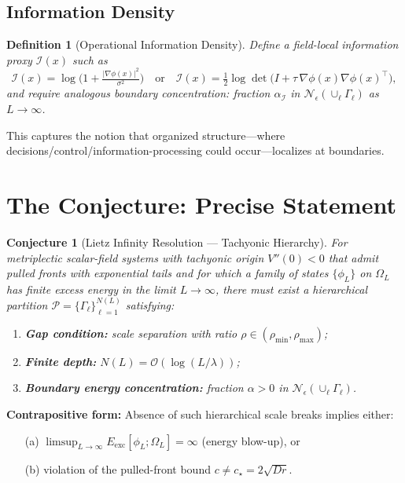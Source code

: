 \documentclass{article}
\newtheorem{conjecture}{Conjecture}
\newtheorem{definition}{Definition}
\begin{document}
\subsection{Information Density}

\begin{definition}[Operational Information Density]
Define a field-local information proxy $\mathcal{I}(x)$ such as
\begin{equation}
\mathcal{I}(x) = \log\!\big(1 + \tfrac{|\nabla \phi(x)|^2}{\sigma^2}\big)
\quad\text{or}\quad
\mathcal{I}(x) = \tfrac{1}{2}\log\!\det\!\big(I + \tau \,\nabla \phi(x)\nabla \phi(x)^\top\big),
\end{equation}
and require analogous boundary concentration: fraction $\alpha_\mathcal{I}$ in $\mathcal{N}_\epsilon(\cup_\ell \Gamma_\ell)$ as $L\to\infty$.
\end{definition}

This captures the notion that organized structure—where decisions/control/information-processing could occur—localizes at boundaries.

\section{The Conjecture: Precise Statement}
\label{sec:conjecture}

\begin{conjecture}[Lietz Infinity Resolution — Tachyonic Hierarchy]
\label{conj:main}
For metriplectic scalar-field systems with tachyonic origin $V''(0)<0$ that admit pulled fronts with exponential tails and for which a family of states $\{\phi_L\}$ on $\Omega_L$ has finite excess energy in the limit $L\to\infty$, there must exist a hierarchical partition $\mathcal{P}=\{\Gamma_\ell\}_{\ell=1}^{N(L)}$ satisfying:
\begin{enumerate}
    \item \textbf{Gap condition:} scale separation with ratio $\rho\in(\rho_{\min},\rho_{\max})$;
    \item \textbf{Finite depth:} $N(L)=\mathcal{O}(\log(L/\lambda))$;
    \item \textbf{Boundary energy concentration:} fraction $\alpha>0$ in $\mathcal{N}_\epsilon(\cup_\ell\Gamma_\ell)$.
\end{enumerate}
\end{conjecture}

\textbf{Contrapositive form:} Absence of such hierarchical scale breaks implies either:
\begin{enumerate}
    \item[(a)] $\limsup_{L\to\infty} E_{\text{exc}}[\phi_L;\Omega_L] = \infty$ (energy blow-up), or
    \item[(b)] violation of the pulled-front bound $c\neq c_\star=2\sqrt{Dr}$.
\end{enumerate}
\end{document}
